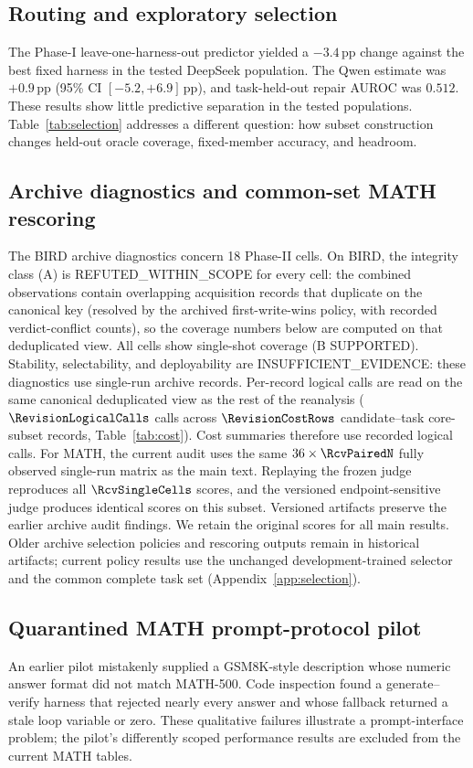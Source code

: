 \subsection{Routing and exploratory selection}\label{sec:boundary}
The Phase-I leave-one-harness-out predictor yielded a $-3.4$\,pp
change against the best fixed harness in the tested DeepSeek population.
The Qwen estimate was $+0.9$\,pp (95\% CI $[-5.2,+6.9]$\,pp), and
task-held-out repair AUROC was $0.512$. These results show little
predictive separation in the tested populations. Table~\ref{tab:selection}
addresses a different question: how subset construction changes
held-out oracle coverage, fixed-member accuracy, and headroom.

\FloatBarrier
\subsection{Archive diagnostics and common-set MATH rescoring}\label{app:archive-analysis}
The BIRD archive diagnostics concern 18 Phase-II cells. On BIRD, the integrity class (A) is REFUTED\_WITHIN\_SCOPE for every cell: the
combined observations contain overlapping acquisition records that
duplicate on the canonical key (resolved by the archived first-write-wins
policy, with recorded verdict-conflict counts), so the coverage numbers
below are computed on that deduplicated view. All cells show
single-shot coverage (B SUPPORTED). Stability, selectability, and
deployability are INSUFFICIENT\_EVIDENCE: these diagnostics use
single-run archive records. Per-record logical calls are read on
the same canonical deduplicated view as the rest of the reanalysis
($\RevisionLogicalCalls$ calls across $\RevisionCostRows$
candidate--task core-subset records, Table~\ref{tab:cost}).
Cost summaries therefore use recorded logical calls. For MATH, the current audit uses the same $36\times\RcvPairedN$
fully observed single-run matrix as the main text. Replaying the frozen
judge reproduces all $\RcvSingleCells$ scores, and the versioned
endpoint-sensitive judge produces identical scores on this subset.
Versioned artifacts preserve the earlier archive audit findings.
We retain the original scores for all main results. Older archive
selection policies and rescoring outputs remain in historical artifacts;
current policy results use the unchanged development-trained selector
and the common complete task set (Appendix~\ref{app:selection}).

\subsection{Quarantined MATH prompt-protocol pilot}
An earlier pilot mistakenly supplied a GSM8K-style description whose
numeric answer format did not match MATH-500. Code inspection found a
generate--verify harness that rejected nearly every answer and whose
fallback returned a stale loop variable or zero. These qualitative
failures illustrate a prompt-interface problem; the pilot's differently
scoped performance results are excluded from the current MATH tables.

